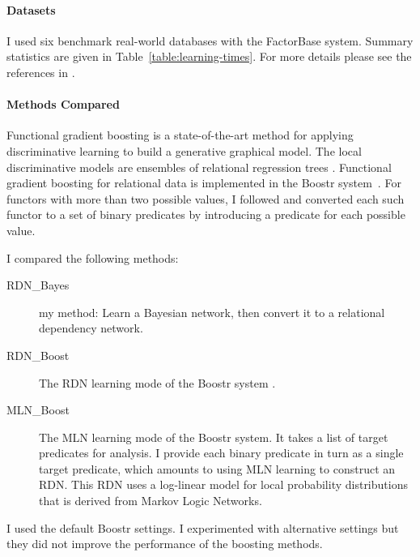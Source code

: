 \documentclass{sfuthesis}
\begin{document}
\paragraph{Datasets}
I used six benchmark real-world databases with the FactorBase system. Summary statistics are given in Table~\ref{table:learning-times}. For more details please see the references in \cite{Schulte2012}.
\paragraph{Methods Compared} Functional gradient boosting is a state-of-the-art method for applying discriminative learning to build a generative graphical model. The local discriminative models are  ensembles of relational regression trees \cite{Khot2011}. Functional gradient boosting for relational data is implemented in the Boostr system~\cite{Khot2013}.
 For functors with more than two possible values, I  followed \cite{Khot2011} and converted each such functor to a set of binary predicates by introducing a predicate for each possible value.

%
I  compared the following methods:
\begin{description}
\item[RDN\_Bayes] my method: Learn a Bayesian network, then convert it to a relational dependency network.
\item[RDN\_Boost] The RDN learning mode of the Boostr system \cite{Natarajan2012}. 
\item[MLN\_Boost] The MLN learning mode of the Boostr system. It takes a  list of target predicates for analysis. I  provide each binary predicate in turn as a single target predicate, which amounts to using MLN learning to construct an RDN. This RDN uses a log-linear model for local probability distributions that is derived from Markov Logic Networks.
\end{description}
I  used the default Boostr settings. I  experimented with alternative settings but they did not improve the performance of the boosting methods.
\end{document}
